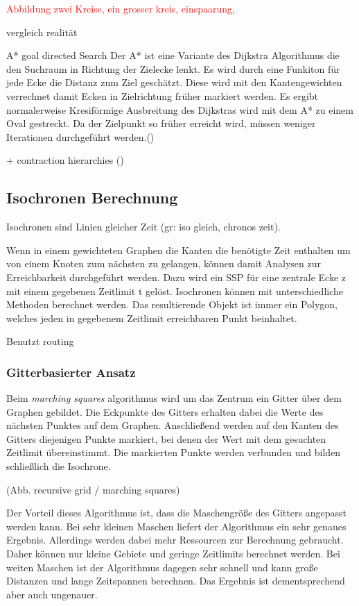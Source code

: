 \documentclass[10pt,a4paper]{article}
\newcommand\todo[1]{\textcolor{red}{#1}}
\begin{document}
\todo{Abbildung zwei Kreise, ein grosser kreis, einspaarung,}

vergleich realität

A*
goal directed Search
Der A* ist eine Variante des Dijkstra Algorithmus die den Suchraum in Richtung der Zielecke lenkt. Es wird durch eine Funkiton für jede Ecke die Distanz zum Ziel geschätzt. Diese wird mit den Kantengewichten verrechnet damit Ecken in Zielrichtung früher markiert werden. Es ergibt normalerweise Kresiförmige Ausbreitung des Dijkstras wird mit dem A* zu einem Oval gestreckt. Da der Zielpunkt so früher erreicht wird, müssen weniger Iterationen durchgeführt werden.(\cite[210f]{kurt})

+ contraction hierarchies
(\cite[212]{kurt})

\subsection{Isochronen Berechnung}

Isochronen sind Linien gleicher Zeit (gr: iso gleich, chronos zeit).

Wenn in einem gewichteten Graphen die Kanten die benötigte Zeit enthalten um von einem Knoten zum nächsten zu gelangen, können damit Analysen zur Erreichbarkeit durchgeführt werden. Dazu wird ein SSP für eine zentrale Ecke z mit einem gegebenen Zeitlimit t gelöst.
Isochronen können mit unterschiedliche Methoden berechnet werden. Das resultierende Objekt ist immer ein Polygon, welches jeden in gegebenem Zeitlimit erreichbaren Punkt beinhaltet.

Benutzt routing

\subsubsection{Gitterbasierter Ansatz}
Beim \textit{marching squares} algorithmus wird um das Zentrum ein Gitter über dem Graphen gebildet. Die Eckpunkte des Gitters erhalten dabei die Werte des nächsten Punktes auf dem Graphen. Anschließend werden auf den Kanten des Gitters diejenigen Punkte markiert, bei denen der Wert mit dem gesuchten Zeitlimit übereinstimmt. Die markierten Punkte werden verbunden und bilden schließlich die Isochrone.

(Abb. recursive grid / marching squares)

Der Vorteil dieses Algorithmus ist, dass die Maschengröße des Gitters angepasst werden kann. Bei sehr kleinen Maschen liefert der Algorithmus ein sehr genaues Ergebnis. Allerdings werden dabei mehr Ressourcen zur Berechnung gebraucht. Daher können nur kleine Gebiete und geringe Zeitlimits berechnet werden. Bei weiten Maschen ist der Algorithmus dagegen sehr schnell und kann große Distanzen und lange Zeitspannen berechnen. Das Ergebnis ist dementsprechend aber auch ungenauer.
\end{document}
